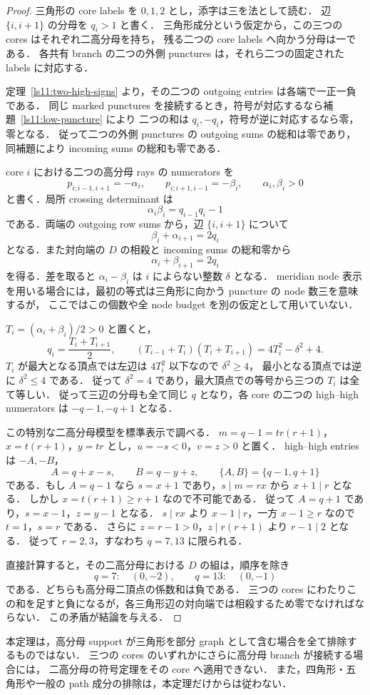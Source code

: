 \begin{proof}
三角形の core labels を $0,1,2$ とし，添字は三を法として読む．
辺 $\{i,i+1\}$ の分母を $q_i>1$ と書く．
三角形成分という仮定から，この三つの cores はそれぞれ二高分母を持ち，
残る二つの core labels へ向かう分母は一である．
各共有 branch の二つの外側 punctures は，それら二つの固定された labels に対応する．

定理~\ref{ls11:two-high-signs} より，その二つの outgoing entries は各端で一正一負である．
同じ marked punctures を接続するとき，符号が対応するなら補題~\ref{ls11:low-puncture} により
二つの和は $q_i,-q_i$，符号が逆に対応するなら零，零となる．
従って二つの外側 punctures の outgoing sums の総和は零であり，
同補題により incoming sums の総和も零である．

core $i$ における二つの高分母 rays の numerators を
\[
 p_{i;i-1,i+1}=-\alpha_i,\qquad
 p_{i;i+1,i-1}=-\beta_i,
 \qquad \alpha_i,\beta_i>0
\]
と書く．局所 crossing determinant は
\begin{equation}\label{ls11:triangle-products}
 \alpha_i\beta_i=q_{i-1}q_i-1
\end{equation}
である．両端の outgoing row sums から，辺 $\{i,i+1\}$ について
\[
 \beta_i+\alpha_{i+1}=2q_i
\]
となる．また対向端の $D$ の相殺と incoming sums の総和零から
\[
 \alpha_i+\beta_{i+1}=2q_i
\]
を得る．差を取ると $\alpha_i-\beta_i$ は $i$ によらない整数 $\delta$ となる．
meridian node 表示を用いる場合には，最初の等式は三角形に向かう puncture の node 数三を意味するが，
ここではこの個数や全 node budget を別の仮定として用いていない．

$T_i=(\alpha_i+\beta_i)/2>0$ と置くと，
\[
 q_i=\frac{T_i+T_{i+1}}2,
 \qquad
 (T_{i-1}+T_i)(T_i+T_{i+1})=4T_i^2-\delta^2+4.
\]
$T_i$ が最大となる頂点では左辺は $4T_i^2$ 以下なので $\delta^2\geq4$，
最小となる頂点では逆に $\delta^2\leq4$ である．
従って $\delta^2=4$ であり，最大頂点での等号から三つの $T_i$ は全て等しい．
従って三辺の分母も全て同じ $q$ となり，各 core の二つの high--high numerators は
$-q-1,-q+1$ となる．

この特別な二高分母模型を標準表示で調べる．
$m=q-1=t r(r+1)$，$x=t(r+1)$，$y=tr$ とし，$u=-s<0$，$v=z>0$ と置く．
high--high entries は $-A,-B$，
\[
 A=q+x-s,\qquad B=q-y+z,\qquad \{A,B\}=\{q-1,q+1\}
\]
である．もし $A=q-1$ なら $s=x+1$ であり，$s\mid m=rx$ から $x+1\mid r$ となる．
しかし $x=t(r+1)\geq r+1$ なので不可能である．
従って $A=q+1$ であり，$s=x-1$，$z=y-1$ となる．
$s\mid rx$ より $x-1\mid r$，一方 $x-1\geq r$ なので $t=1$，$s=r$ である．
さらに $z=r-1>0$，$z\mid r(r+1)$ より $r-1\mid2$ となる．
従って $r=2,3$，すなわち $q=7,13$ に限られる．

直接計算すると，その二高分母における $D$ の組は，順序を除き
\[
 q=7:\quad (0,-2),\qquad
 q=13:\quad (0,-1)
\]
である．どちらも高分母二頂点の係数和は負である．
三つの cores にわたりこの和を足すと負になるが，各三角形辺の対向端では相殺するため零でなければならない．
この矛盾が結論を与える．
\end{proof}

本定理は，高分母 support が三角形を部分 graph として含む場合を全て排除するものではない．
三つの cores のいずれかにさらに高分母 branch が接続する場合には，
二高分母の符号定理をその core へ適用できない．
また，四角形・五角形や一般の path 成分の排除は，本定理だけからは従わない．
